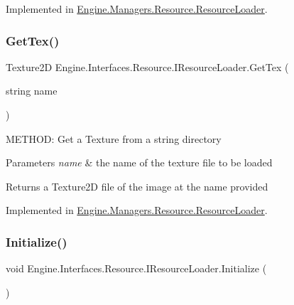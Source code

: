 Implemented in \hyperlink{a00530_a6587452c5637a132330fb0e2f6dc4e7a}{Engine.\+Managers.\+Resource.\+Resource\+Loader}.

\mbox{\label{a00462_ad126b831364ad6219c3f25729c591597}} 
\subsubsection{\texorpdfstring{Get\+Tex()}{GetTex()}}
{\footnotesize\ttfamily Texture2D Engine.\+Interfaces.\+Resource.\+I\+Resource\+Loader.\+Get\+Tex (\begin{DoxyParamCaption}\item[{string}]{name }\end{DoxyParamCaption})}



M\+E\+T\+H\+OD\+: Get a Texture from a string directory 


\begin{DoxyParams}{Parameters}
{\em name} & the name of the texture file to be loaded\\
\hline
\end{DoxyParams}
\begin{DoxyReturn}{Returns}
a Texture2D file of the image at the name provided
\end{DoxyReturn}


Implemented in \hyperlink{a00530_a841de899c3601b3d35496ee798a6e894}{Engine.\+Managers.\+Resource.\+Resource\+Loader}.

\mbox{\label{a00462_ad861af436f861ea7d9c0966edfadac82}} 
\subsubsection{\texorpdfstring{Initialize()}{Initialize()}}
{\footnotesize\ttfamily void Engine.\+Interfaces.\+Resource.\+I\+Resource\+Loader.\+Initialize (\begin{DoxyParamCaption}{ }\end{DoxyParamCaption})}



